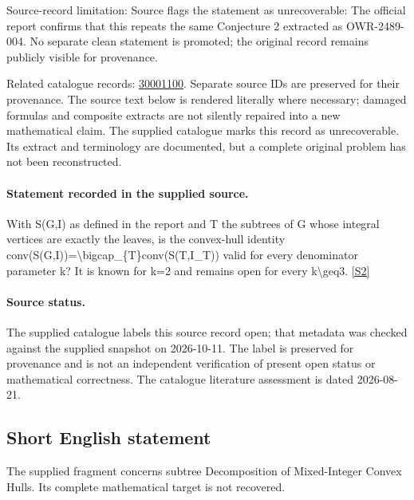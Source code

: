 \documentclass[11pt]{article}
\begin{document}
Source-record limitation: Source flags the statement as unrecoverable: The official report confirms that this repeats the same Conjecture 2 extracted as OWR-2489-004. No separate clean statement is promoted; the original record remains publicly visible for provenance.

Related catalogue records: \href{https://mehmetmars7.github.io/Erdosproblems-llm-hunter/problem.html?type=open_problems&id=30001100}{30001100}. Separate source IDs are preserved for their provenance.
The source text below is rendered literally where necessary; damaged formulas and composite extracts are not silently repaired into a new mathematical claim.
The supplied catalogue marks this record as unrecoverable. Its extract and terminology are documented, but a complete original problem has not been reconstructed.
\paragraph{Statement recorded in the supplied source.}
With S(G,I) as defined in the report and T the subtrees of G whose integral vertices are exactly the leaves, is the convex-hull identity conv(S(G,I))=\textbackslash{}bigcap\_\{T\}conv(S(T,I\_T)) valid for every denominator parameter k? It is known for k=2 and remains open for every k\textbackslash{}geq3. \href{https://doi.org/10.4171/owr/2008/51}{[S2]}
\paragraph{Source status.}
The supplied catalogue labels this source record open; that metadata was checked against the supplied snapshot on 2026-10-11. The label is preserved for provenance and is not an independent verification of present open status or mathematical correctness. The catalogue literature assessment is dated 2026-08-21.
\subsection{Short English statement}
The supplied fragment concerns subtree Decomposition of Mixed-Integer Convex Hulls. Its complete mathematical target is not recovered.
\end{document}
